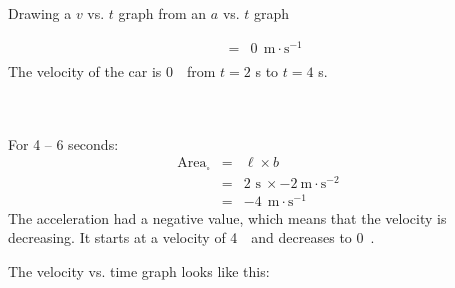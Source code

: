 \begin{wex}{Drawing a $v$ vs. $t$ graph from an $a$ vs. $t$ graph}
{\begin{minipage}{0.3\textwidth}
\begin{eqnarray*}
&=&0\ ~\text{m}\cdot \text{s}^{-1}\\
\end{eqnarray*}
The velocity of the car is 0~\ms ~from $t=2$ s to $t=4$ s.\\
\\
\\
\end{minipage}
\begin{minipage}{0.03\textwidth}
\begin{center}
\end{center}
\end{minipage}
\begin{minipage}{0.3\textwidth}
For 4 -- 6 seconds:
\begin{eqnarray*}
\text{Area}_{\square} &=& \ell \times b\\
&=& 2\text{~s}\ \times -2~\text{m}\cdot \text{s}^{-2}\ \\
&=&-4\ ~\text{m}\cdot \text{s}^{-1}
\end{eqnarray*}
The acceleration had a negative value, which means that the velocity is decreasing. It starts at a velocity of 4~\ms ~and decreases to 0~\ms.\\
\end{minipage}
\begin{minipage}{0.3\textwidth}
The velocity vs. time graph looks like this:
\end{minipage}
\begin{minipage}{0.7\textwidth}
\begin{center}
\end{center}
\end{minipage}
}
\end{wex}
    \noindent
   \label{m38795*secfhsst!!!underscore!!!id3332}
